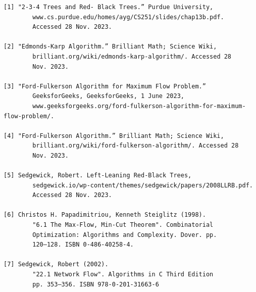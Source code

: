 \documentclass[12pt]{amsart}
\begin{document}
\begin{verbatim}
[1] "2-3-4 Trees and Red- Black Trees.” Purdue University,
        www.cs.purdue.edu/homes/ayg/CS251/slides/chap13b.pdf.
        Accessed 28 Nov. 2023. 

[2] "Edmonds-Karp Algorithm.” Brilliant Math; Science Wiki,
        brilliant.org/wiki/edmonds-karp-algorithm/. Accessed 28
        Nov. 2023. 

[3] "Ford-Fulkerson Algorithm for Maximum Flow Problem.”
        GeeksforGeeks, GeeksforGeeks, 1 June 2023,
        www.geeksforgeeks.org/ford-fulkerson-algorithm-for-maximum-flow-problem/. 

[4] "Ford-Fulkerson Algorithm.” Brilliant Math; Science Wiki,
        brilliant.org/wiki/ford-fulkerson-algorithm/. Accessed 28
        Nov. 2023. 

[5] Sedgewick, Robert. Left-Leaning Red-Black Trees,
        sedgewick.io/wp-content/themes/sedgewick/papers/2008LLRB.pdf.
        Accessed 28 Nov. 2023. 

[6] Christos H. Papadimitriou, Kenneth Steiglitz (1998).
        "6.1 The Max-Flow, Min-Cut Theorem". Combinatorial
        Optimization: Algorithms and Complexity. Dover. pp.
        120–128. ISBN 0-486-40258-4.

[7] Sedgewick, Robert (2002).
        "22.1 Network Flow". Algorithms in C Third Edition
        pp. 353–356. ISBN 978-0-201-31663-6 

\end{verbatim}
\end{document}
